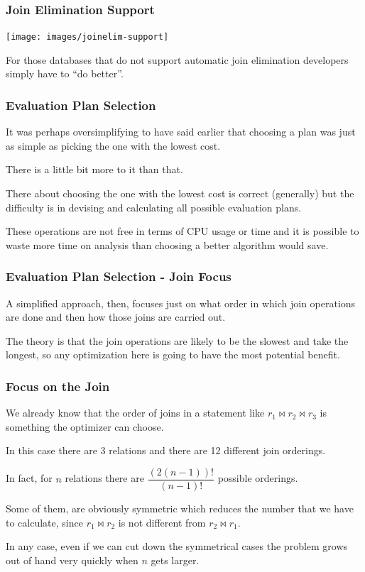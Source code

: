 \begin{frame}
\frametitle{Join Elimination Support}

\begin{center}
	\texttt{[image: images/joinelim-support]}
\end{center}

For those databases that do not support automatic join elimination developers simply have to ``do better''. 

\end{frame}


\begin{frame}
\frametitle{Evaluation Plan Selection}

It was perhaps oversimplifying to have said earlier that choosing a plan was just as simple as picking the one with the lowest cost. 

There is a little bit more to it than that.

There about choosing the one with the lowest cost is correct (generally) but the difficulty is in devising and calculating all possible evaluation plans. 

These operations are not free in terms of CPU usage or time and it is possible to waste more time on analysis than choosing a better algorithm would save. 

\end{frame}


\begin{frame}
\frametitle{Evaluation Plan Selection - Join Focus}

A simplified approach, then, focuses just on what order in which join operations are done and then how those joins are carried out. 

The theory is that the join operations are likely to be the slowest and take the longest, so any optimization here is going to have the most potential benefit.


\end{frame}

\begin{frame}
\frametitle{Focus on the Join}

We already know that the order of joins in a statement like $r_{1} \bowtie r_{2} \bowtie r_{3}$ is something the optimizer can choose. 

In this case there are 3 relations and there are 12 different join orderings. 

In fact, for $n$ relations there are $\dfrac{(2(n-1))!}{(n-1)!}$ possible orderings. 

Some of them, are obviously symmetric which reduces the number that we have to calculate, since $r_{1} \bowtie r_{2}$ is not different from $r_{2} \bowtie r_{1}$. 

In any case, even if we can cut down the symmetrical cases the problem grows out of hand very quickly when $n$ gets larger.


\end{frame}


